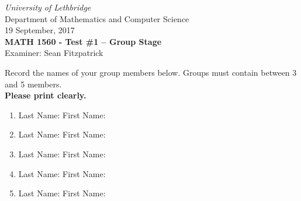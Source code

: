 \documentclass[12pt]{article}
\newcommand{\skipline}{\vspace{12pt}}
\begin{document}
\author{Instructor: Sean Fitzpatrick}
\thispagestyle{plain}
\begin{center}
\emph{University of Lethbridge}\\
Department of Mathematics and Computer Science\\
19 September, 2017\\
{\bf MATH 1560 - Test \#1 -- Group Stage}\\
Examiner: Sean Fitzpatrick
\end{center}

\skipline \skipline \skipline \noindent \skipline

Record the names of your group members below. Groups must contain between 3 and 5 members. \\

\textbf{Please print clearly.}

\skipline

\begin{enumerate}
\item Last Name:\underline{\hspace{200pt}} \quad First Name:\underline{\hspace{140pt}}

\skipline\skipline

\item Last Name:\underline{\hspace{200pt}} \quad First Name:\underline{\hspace{140pt}}

\skipline\skipline

\item Last Name:\underline{\hspace{200pt}} \quad First Name:\underline{\hspace{140pt}}

\skipline\skipline

\item Last Name:\underline{\hspace{200pt}} \quad First Name:\underline{\hspace{140pt}}

\skipline\skipline

\item Last Name:\underline{\hspace{200pt}} \quad First Name:\underline{\hspace{140pt}}

\end{enumerate}
%
\end{document}
